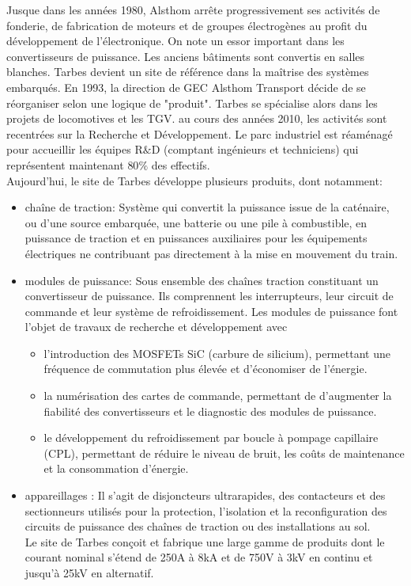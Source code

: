 \documentclass[a4paper]{report}
\begin{document}
	Jusque dans les années 1980, Alsthom arrête progressivement ses activités de fonderie, de fabrication de moteurs et de groupes électrogènes au profit du développement de l'électronique.
	On note un essor important dans les convertisseurs de puissance. Les anciens bâtiments sont convertis en salles blanches. Tarbes devient un site de référence dans la maîtrise des systèmes embarqués. En 1993, la direction de GEC Alsthom Transport décide de se réorganiser selon une logique de "produit".
	Tarbes se spécialise alors dans les projets de locomotives et les TGV. au cours des années 2010, les activités sont recentrées sur la Recherche et Développement.
	Le parc industriel est réaménagé pour accueillir les équipes R$\&$D (comptant ingénieurs et techniciens) qui représentent maintenant $80\% $ des effectifs.\\
	Aujourd'hui, le site de Tarbes développe plusieurs produits, dont notamment:
	\begin{itemize}
		\item chaîne de traction:
		Système qui convertit la puissance issue de la caténaire, ou d'une source embarquée, une batterie ou une pile à combustible, en puissance de traction et en puissances auxiliaires pour les équipements électriques ne contribuant pas directement à la mise en mouvement du train.
		\item modules de puissance:
		Sous ensemble des chaînes traction constituant un convertisseur de puissance. Ils comprennent les interrupteurs, leur circuit de commande et leur système de refroidissement. Les modules de puissance font l'objet de travaux de recherche et développement avec
		\begin{itemize}
			\item l'introduction des MOSFETs SiC (carbure de silicium), permettant une fréquence de commutation plus élevée et d'économiser de l'énergie.
			\item la numérisation des cartes de commande, permettant de d'augmenter la fiabilité des convertisseurs et le diagnostic des modules de puissance.
			\item le développement du refroidissement par boucle à pompage capillaire (CPL), permettant de réduire le niveau de bruit, les coûts de maintenance et la consommation d'énergie.
		\end{itemize}
		\item appareillages :
		Il s'agit de disjoncteurs ultrarapides, des contacteurs et des sectionneurs utilisés pour la protection, l'isolation et la reconfiguration des circuits de puissance des chaînes de traction ou des installations au sol.\\
		Le site de Tarbes conçoit et fabrique une large gamme de produits dont le courant nominal s'étend de 250A à 8kA et de 750V à 3kV en continu et jusqu'à 25kV en alternatif.\\
	\end{itemize}
	
\end{document}
